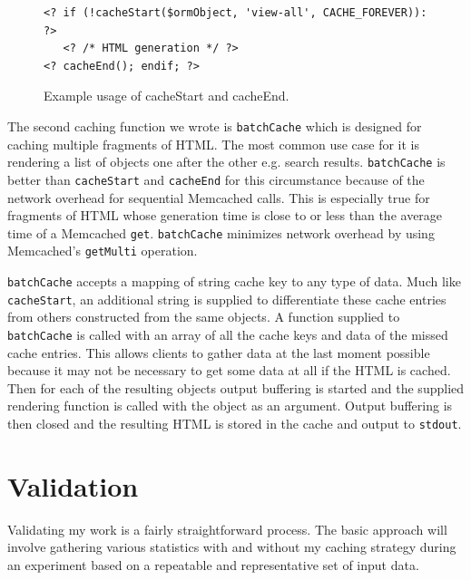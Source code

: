 \documentclass[12pt]{ucthesis}
\begin{document}
\begin{figure}[h]
\begin{ssp}
\begin{verbatim}
<? if (!cacheStart($ormObject, 'view-all', CACHE_FOREVER)): ?>
   <? /* HTML generation */ ?>
<? cacheEnd(); endif; ?>
\end{verbatim}
\end{ssp}
\caption{Example usage of cacheStart and cacheEnd.}
\label{fig:cacheStartExample}
\end{figure}

The second caching function we wrote is {\tt batchCache} which is designed for caching multiple fragments of HTML.
The most common use case for it is rendering a list of objects one after the other e.g. search results.
{\tt batchCache} is better than {\tt cacheStart} and {\tt cacheEnd} for this circumstance because of the network overhead for sequential \textsf{Memcached} calls.
This is especially true for fragments of HTML whose generation time is close to or less than the average time of a \textsf{Memcached} {\tt get}.
{\tt batchCache} minimizes network overhead by using \textsf{Memcached}'s {\tt getMulti} operation.

{\tt batchCache} accepts a mapping of string cache key to any type of data.
Much like {\tt cacheStart}, an additional string is supplied to differentiate these cache entries from others constructed from the same objects.
A function supplied to {\tt batchCache} is called with an array of all the cache keys and data of the missed cache entries.
This allows clients to gather data at the last moment possible because it may not be necessary to get some data at all if the HTML is cached.
Then for each of the resulting objects output buffering is started and the supplied rendering function is called with the object as an argument.
Output buffering is then closed and the resulting HTML is stored in the cache and output to {\tt stdout}.



\chapter{Validation}
\label{validation}

Validating my work is a fairly straightforward process.
The basic approach will involve gathering various statistics with and without my caching strategy during an experiment based on a repeatable and representative set of input data.
\end{document}
